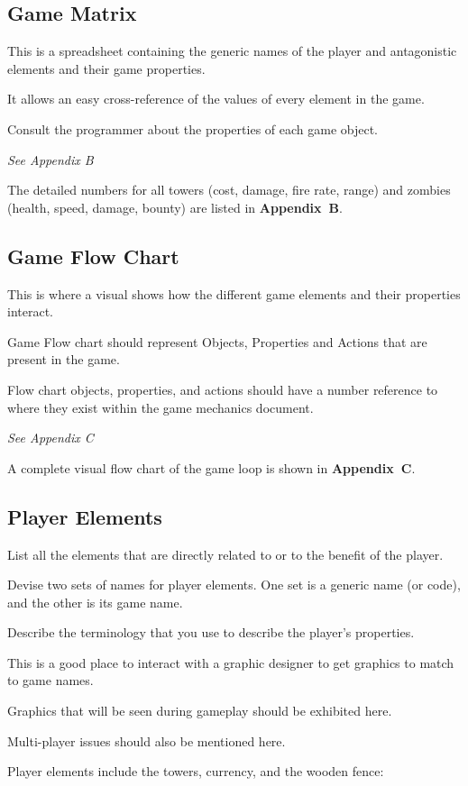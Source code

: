 \subsection{Game Matrix}

\begin{guidance}
This is a spreadsheet containing the generic names of the player and antagonistic elements and their game properties.

It allows an easy cross-reference of the values of every element in the game.

Consult the programmer about the properties of each game object.

\textit{See Appendix B}
\end{guidance}
The detailed numbers for all towers (cost, damage, fire rate, range) and zombies (health, speed, damage, bounty) are listed in \textbf{Appendix~B}.

\subsection{Game Flow Chart}

\begin{guidance}
This is where a visual shows how the different game elements and their properties interact.

Game Flow chart should represent Objects, Properties and Actions that are present in the game.

Flow chart objects, properties, and actions should have a number reference to where they exist within the game mechanics document.

\textit{See Appendix C}
\end{guidance}
A complete visual flow chart of the game loop is shown in \textbf{Appendix~C}.

\subsection{Player Elements}

\begin{guidance}
List all the elements that are directly related to or to the benefit of the player.

Devise two sets of names for player elements. One set is a generic name (or code), and the other is its game name.

Describe the terminology that you use to describe the player’s properties.

This is a good place to interact with a graphic designer to get graphics to match to game names.

Graphics that will be seen during gameplay should be exhibited here.

Multi-player issues should also be mentioned here.
\end{guidance}
Player elements include the towers, currency, and the wooden fence:

